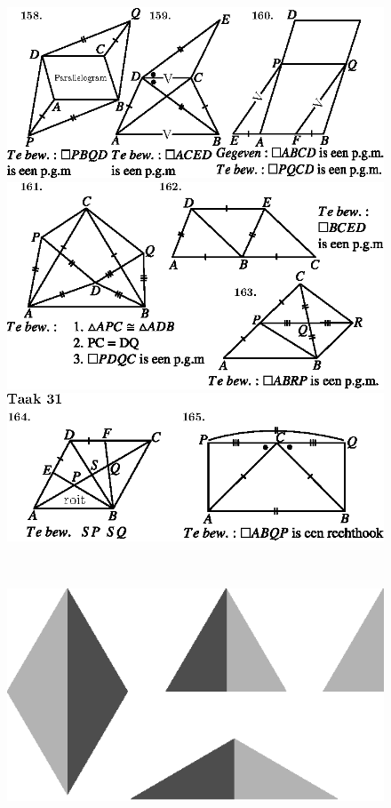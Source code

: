 \begin{figure}[H]
\centering
\includegraphics{figure/fig_05a.eps}
\bigskip
\medskip

\includegraphics[scale=.95]{figure/fig_05b.eps}

\medskip
\bigskip
\includegraphics[scale=.95]{figure/fig_05c.eps}
\caption{}\label{chap6-fig5}
\end{figure}

\vfill\eject

~\phantom{a}

\begin{figure}[H]
\centering
\includegraphics{figure/fig_06.eps}
\caption{}\label{chap6-fig6}
\end{figure}


